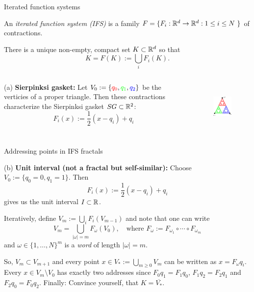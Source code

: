 \begin{frame}{Iterated function systems}
    \begin{definition}
        An \textit{iterated function system (IFS)} is a family \(F = \{ F_i: \R^d \to \R^d : 1 \leq i \leq N \ \} \) of contractions.
    \end{definition}

    \begin{theorem}[Hutchinson, 1981]
        There is a unique non-empty, compact set \(K \subset \mathbb{R}^d \) so that
        \[ K = F(K) := \bigcup_i F_i(K). \]
    \end{theorem}

    \begin{example}
        \begin{columns}[c]
            (a) \textbf{Sierpinksi gasket:} Let \(V_0 := \{\textcolor{red}{q_0}, \textcolor{green}{q_1}, \textcolor{blue}{q_2} \} \) be the verticies of a proper triangle. Then these contractions characterize the Sierpinksi gasket \(SG \subset \mathbb{R}^2 \):
            \[ F_i(x) := \frac{1}{2}(x - q_i) + q_i \]
            \begin{figure}
                \includegraphics[height=7em]{images/colored.pdf}
            \end{figure}
        \end{columns}
    \end{example}
\end{frame}

\begin{frame}{Addressing points in IFS fractals}
    \addtocounter{definition}{-1}
    \begin{example}[Cont.]
        (b) \textbf{Unit interval (not a fractal but self-similar):} Choose \(V_0 := \{q_0 = 0, q_1 = 1 \} \). Then
        \[ F_i(x) := \frac{1}{2}(x - q_i) + q_i \]
        gives us the unit interval \(I \subset \mathbb{R} \).
    \end{example}

    Iteratively, define \(V_m := \bigcup_i F_i(V_{m-1}) \) and note that one can write
    \[ V_m = \bigcup_{| \omega | = m} F_\omega(V_0), \quad \text{where } F_\omega := F_{\omega_1} \circ \cdots \circ F_{\omega_m} \]
    and \(\omega \in \{1, \dots, N \}^m \) is a \textit{word} of length \(| \omega | = m \).

    So, \(V_m \subset V_{m+1} \) and every point \(x \in V_* := \bigcup_{m \geq 0} V_m \) can be written as \(x = F_\omega q_i \).  Every \(x \in V_m \setminus V_0 \) has exactly two addresses since \(F_0 q_1 = F_1 q_0 \), \(F_1 q_2 = F_2 q_1 \) and \(F_2 q_0 = F_0 q_2 \).
    Finally: Convince yourself, that \(K = \overline{V_*} \).
\end{frame}

